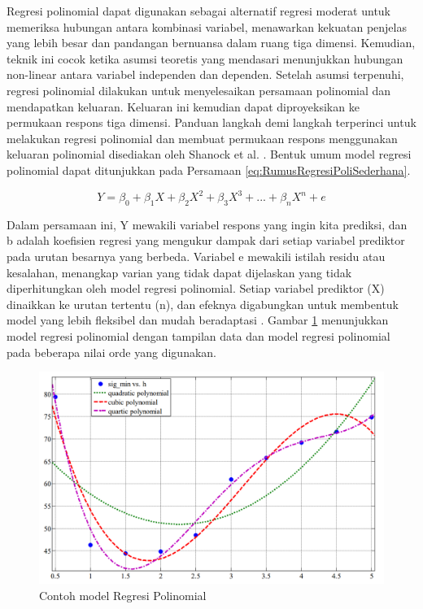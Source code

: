 Regresi polinomial dapat digunakan sebagai alternatif regresi moderat untuk memeriksa hubungan antara kombinasi variabel, menawarkan kekuatan penjelas yang lebih besar dan pandangan bernuansa dalam ruang tiga dimensi. Kemudian, teknik ini cocok ketika asumsi teoretis yang mendasari menunjukkan hubungan non-linear antara variabel independen dan dependen. Setelah asumsi terpenuhi, regresi polinomial dilakukan untuk menyelesaikan persamaan polinomial dan mendapatkan keluaran. Keluaran ini kemudian dapat diproyeksikan ke permukaan respons tiga dimensi. Panduan langkah demi langkah terperinci untuk melakukan regresi polinomial dan membuat permukaan respons menggunakan keluaran polinomial disediakan oleh Shanock et al. \parencite{Shanock}. Bentuk umum model regresi polinomial dapat ditunjukkan pada Persamaan \ref{eq:RumusRegresiPoliSederhana}.

\begin{equation}
  \label{eq:RumusRegresiPoliSederhana}
  Y = \beta_0 + \beta_1 X + \beta_2 X^2 + \beta_3 X^3 + ... + \beta_n X^n + e
\end{equation}

Dalam persamaan ini, Y mewakili variabel respons yang ingin kita prediksi, dan b adalah koefisien regresi yang mengukur dampak dari setiap variabel prediktor pada urutan besarnya yang berbeda. Variabel e mewakili istilah residu atau kesalahan, menangkap varian yang tidak dapat dijelaskan yang tidak diperhitungkan oleh model regresi polinomial. Setiap variabel prediktor (X) dinaikkan ke urutan tertentu (n), dan efeknya digabungkan untuk membentuk model yang lebih fleksibel dan mudah beradaptasi \parencite{Malensang}. Gambar \ref{fig:plotregresipoli} menunjukkan model regresi polinomial dengan tampilan data dan model regresi polinomial pada beberapa nilai orde yang digunakan.

\begin{figure}[H]
  \centering
  \includegraphics[scale=0.35]{gambar/plotpolinomialsederhana.png}
  \caption{Contoh model Regresi Polinomial \parencite{Ostertagova}}
  \label{fig:plotregresipoli}
\end{figure}



